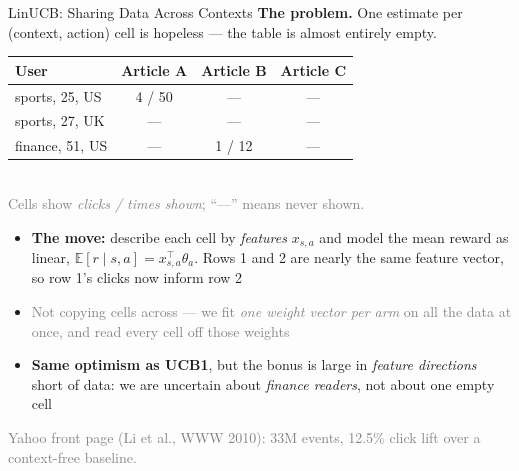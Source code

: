 \begin{frame}{LinUCB: Sharing Data Across Contexts}
\textbf{The problem.} One estimate per (context, action) cell is hopeless --- the table is almost entirely empty.
\begin{center}
\footnotesize
\renewcommand{\arraystretch}{1.15}
\begin{tabular}{lccc}
\hline
\textbf{User} & \textbf{Article A} & \textbf{Article B} & \textbf{Article C} \\
\hline
sports, 25, US   & 4 / 50 & --- & --- \\
sports, 27, UK   & ---    & --- & --- \\
finance, 51, US  & ---    & 1 / 12 & --- \\
\hline
\end{tabular}\\[0.2em]
{\scriptsize\textcolor{gray}{Cells show \emph{clicks / times shown}; ``---'' means never shown.}}
\end{center}
\begin{itemize}
    \setlength{\itemsep}{0.25em}
    \item \textbf{The move:} describe each cell by \emph{features} $x_{s,a}$ and model the mean reward as linear, $\mathbb{E}[r \mid s,a] = x_{s,a}^\top\theta_a$. Rows 1 and 2 are nearly the same feature vector, so row 1's clicks now inform row 2
    \item \textcolor{gray}{Not copying cells across --- we fit \emph{one weight vector per arm} on all the data at once, and read every cell off those weights}
    \item \textbf{Same optimism as UCB1}, but the bonus is large in \emph{feature directions} short of data: we are uncertain about \emph{finance readers}, not about one empty cell
\end{itemize}
\centering\small\textcolor{gray}{Yahoo front page (Li et al., WWW 2010): 33M events, 12.5\% click lift over a context-free baseline.}
\end{frame}

